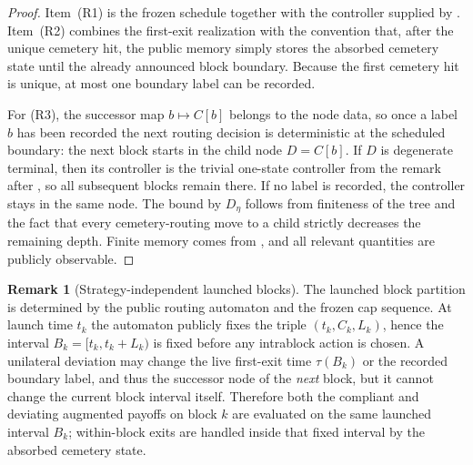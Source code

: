 \documentclass[12pt]{article}
\theoremstyle{definition}
\newtheorem{remark}[theorem]{Remark}
\newcommand{\1}{\mathbf{1}}
\begin{document}
\begin{proof}
Item~(R1) is the frozen schedule together with the controller supplied by
. Item~(R2) combines the first-exit realization with
the convention that, after the unique cemetery hit, the public memory simply
stores the absorbed cemetery state until the already announced block boundary.
Because the first cemetery hit is unique, at most one boundary label can be
recorded.

For (R3), the successor map $b\mapsto C[b]$ belongs to the node data, so once a
label $b$ has been recorded the next routing decision is deterministic at the
scheduled boundary: the next block starts in the child node $D=C[b]$. If $D$ is
degenerate terminal, then its controller is the trivial one-state controller from
the remark after , so all subsequent blocks remain
there. If no label is recorded, the controller stays in the same node. The bound
by $D_\eta$ follows from finiteness of the tree and the fact that every
cemetery-routing move to a child strictly decreases the remaining depth. Finite
memory comes from , and all relevant quantities are
publicly observable.
\end{proof}

\begin{remark}[Strategy-independent launched blocks]
\label{rem:strategy-independent-blocks}
The launched block partition is determined by the public routing automaton and
the frozen cap sequence. At launch time $t_k$ the automaton publicly fixes the
triple $(t_k,C_k,L_k)$, hence the interval $B_k=[t_k,t_k+L_k)$ is fixed before
any intrablock action is chosen. A unilateral deviation may change the live
first-exit time $\tau(B_k)$ or the recorded boundary label, and thus the
successor node of the \emph{next} block, but it cannot change the current block
interval itself. Therefore both the compliant and deviating augmented payoffs on
block $k$ are evaluated on the same launched interval $B_k$; within-block exits
are handled inside that fixed interval by the absorbed cemetery state.
\end{remark}
\end{document}
